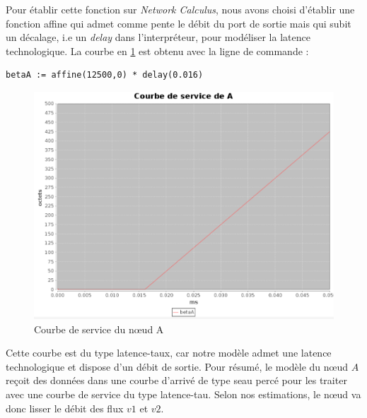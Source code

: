 Pour établir cette fonction sur \emph{Network Calculus}, nous avons choisi d'établir une fonction affine qui admet comme pente le débit du port de sortie mais qui subit un décalage, i.e un \emph{delay} dans l'interpréteur, pour modéliser la latence technologique. La courbe en \ref{fig:serviceA} est obtenu avec la ligne de commande :
\begin{verbatim}
betaA := affine(12500,0) * delay(0.016) 
\end{verbatim}
\begin{figure}[!ht]\label{fig:serviceA}
\centering
\includegraphics[width = .5\textwidth]{./I/images/beta_A.png}
\caption{Courbe de service du nœud A}
\end{figure} 

Cette courbe est du type latence-taux, car notre modèle admet une latence technologique et dispose d'un débit de sortie. Pour résumé, le modèle du nœud $A$ reçoit des données dans une courbe d'arrivé de type seau percé pour les traiter avec une courbe de service du type latence-tau. Selon nos estimations, le nœud va donc lisser le débit des flux $v1$ et $v2$.

